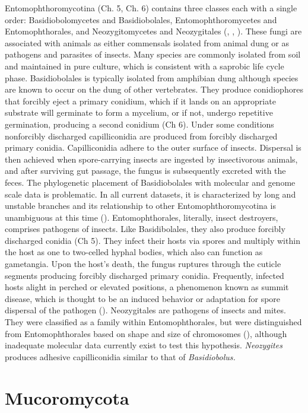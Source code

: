 \documentclass[]{book}
\begin{document}
Entomophthoromycotina (Ch. 5, Ch. 6) contains three classes each with a
single order: Basidiobolomycetes and Basidiobolales,
Entomophthoromycetes and Entomophthorales, and Neozygitomycetes and
Neozygitales (\citet{Humber_2012}, \citet{Benny_2014},
\citet{Spatafora_2016}). These fungi are associated with animals as
either commensals isolated from animal dung or as pathogens and
parasites of insects. Many species are commonly isolated from soil and
maintained in pure culture, which is consistent with a saprobic life
cycle phase. Basidiobolales is typically isolated from amphibian dung
although species are known to occur on the dung of other vertebrates.
They produce conidiophores that forcibly eject a primary conidium, which
if it lands on an appropriate substrate will germinate to form a
mycelium, or if not, undergo repetitive germination, producing a second
conidium (Ch 6). Under some conditions nonforcibly discharged
capilliconidia are produced from forcibly discharged primary conidia.
Capilliconidia adhere to the outer surface of insects. Dispersal is then
achieved when spore-carrying insects are ingested by insectivorous
animals, and after surviving gut passage, the fungus is subsequently
excreted with the feces. The phylogenetic placement of Basidiobolales
with molecular and genome scale data is problematic. In all current
datasets, it is characterized by long and unstable branches and its
relationship to other Entomophthoromycotina is unambiguous at this time
(\citet{Gryganskyi_2012}). Entomophthorales, literally, insect
destroyers, comprises pathogens of insects. Like Basidibolales, they
also produce forcibly discharged conidia (Ch 5). They infect their hosts
via spores and multiply within the host as one to two-celled hyphal
bodies, which also can function as gametangia. Upon the host's death,
the fungus ruptures through the cuticle segments producing forcibly
discharged primary conidia. Frequently, infected hosts alight in perched
or elevated positions, a phenomenon known as summit disease, which is
thought to be an induced behavior or adaptation for spore dispersal of
the pathogen (\citet{Gryganskyi_2017}). Neozygitales are pathogens of
insects and mites. They were classified as a family within
Entomophthorales, but were distinguished from Entomophthorales based on
shape and size of chromosomes (\citet{Humber_2012}), although inadequate
molecular data currently exist to test this hypothesis.
\emph{Neozygites} produces adhesive capilliconidia similar to that of
\emph{Basidiobolus.}

\section{Mucoromycota}\label{mucoromycota}
\end{document}
